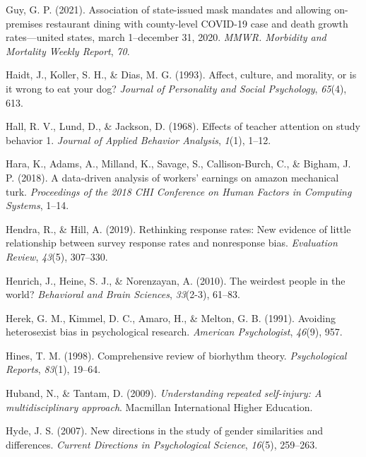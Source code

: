 \documentclass[
]{krantz}
\newlength{\cslhangindent}
\newenvironment{CSLReferences}[2] %
 {\begin{list}{}{%
  \setlength{\itemindent}{0pt}
  \setlength{\leftmargin}{0pt}
  \setlength{\parsep}{0pt}
  \ifodd #1
   \setlength{\leftmargin}{\cslhangindent}
   \setlength{\itemindent}{-1\cslhangindent}
  \fi
  \setlength{\itemsep}{#2\baselineskip}}}
 {\end{list}}
\begin{document}
\begin{CSLReferences}{1}{0}
Guy, G. P. (2021). Association of state-issued mask mandates and allowing on-premises restaurant dining with county-level COVID-19 case and death growth rates---united states, march 1--december 31, 2020. \emph{MMWR. Morbidity and Mortality Weekly Report}, \emph{70}.

Haidt, J., Koller, S. H., \& Dias, M. G. (1993). Affect, culture, and morality, or is it wrong to eat your dog? \emph{Journal of Personality and Social Psychology}, \emph{65}(4), 613.

Hall, R. V., Lund, D., \& Jackson, D. (1968). Effects of teacher attention on study behavior 1. \emph{Journal of Applied Behavior Analysis}, \emph{1}(1), 1--12.

Hara, K., Adams, A., Milland, K., Savage, S., Callison-Burch, C., \& Bigham, J. P. (2018). A data-driven analysis of workers' earnings on amazon mechanical turk. \emph{Proceedings of the 2018 CHI Conference on Human Factors in Computing Systems}, 1--14.

Hendra, R., \& Hill, A. (2019). Rethinking response rates: New evidence of little relationship between survey response rates and nonresponse bias. \emph{Evaluation Review}, \emph{43}(5), 307--330.

Henrich, J., Heine, S. J., \& Norenzayan, A. (2010). The weirdest people in the world? \emph{Behavioral and Brain Sciences}, \emph{33}(2-3), 61--83.

Herek, G. M., Kimmel, D. C., Amaro, H., \& Melton, G. B. (1991). Avoiding heterosexist bias in psychological research. \emph{American Psychologist}, \emph{46}(9), 957.

Hines, T. M. (1998). Comprehensive review of biorhythm theory. \emph{Psychological Reports}, \emph{83}(1), 19--64.

Huband, N., \& Tantam, D. (2009). \emph{Understanding repeated self-injury: A multidisciplinary approach}. Macmillan International Higher Education.

Hyde, J. S. (2007). New directions in the study of gender similarities and differences. \emph{Current Directions in Psychological Science}, \emph{16}(5), 259--263.


\end{CSLReferences}
\end{document}

